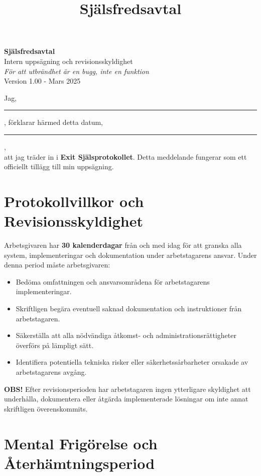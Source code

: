 \documentclass[a4paper,11pt]{article}
\title{Själsfredsavtal}
\date{}
\begin{document}
\pagestyle{empty}

\begin{center}
    {\LARGE \textbf{Själsfredsavtal}}\\[1em]
    {\large Intern uppsägning och revisionsskyldighet}\\[0.5em]
    \textit{För att utbrändhet är en bugg, inte en funktion}\\[0.5em]
    {\small Version 1.00 - Mars 2025}
\end{center}

\vspace{2em}

Jag, \rule{7cm}{0.2pt}, förklarar härmed detta datum, \rule{4cm}{0.2pt},\\
att jag träder in i \textbf{Exit Själsprotokollet}. Detta meddelande fungerar som ett officiellt tillägg till min uppsägning.

\section*{Protokollvillkor och Revisionsskyldighet}

Arbetsgivaren har \textbf{30 kalenderdagar} från och med idag för att granska alla system, implementeringar och dokumentation under arbetstagarens ansvar. Under denna period måste arbetsgivaren:

\begin{itemize}
    \item Bedöma omfattningen och ansvarsområdena för arbetstagarens implementeringar.
    \item Skriftligen begära eventuell saknad dokumentation och instruktioner från arbetstagaren.
    \item Säkerställa att alla nödvändiga åtkomst- och administrationsrättigheter överförs på lämpligt sätt.
    \item Identifiera potentiella tekniska risker eller säkerhetssårbarheter orsakade av arbetstagarens avgång.
\end{itemize}

\textbf{OBS!} Efter revisionsperioden har arbetstagaren ingen ytterligare skyldighet att underhålla, dokumentera eller åtgärda implementerade lösningar om inte annat skriftligen överenskommits.

\section*{Mental Frigörelse och Återhämtningsperiod}
\end{document}
